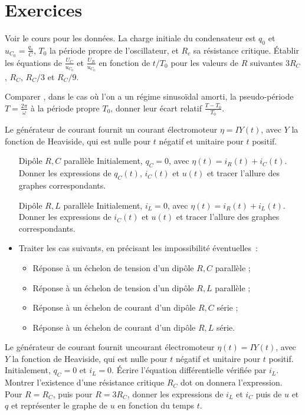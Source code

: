 \section{Exercices}
	\begin{exercice}
		Voir le cours pour les données. La charge initiale du condensateur est $q_0$ et $u_{C_0} = \frac{q_0}{C}$, $T_0$ la période propre de l'oscillateur, et $R_c$ sa résistance critique. Établir les équations de $\frac{U_C}{u_{C_0}}$ et $\frac{U_R}{u_{C_0}}$ en fonction de $t/T_0$ pour les valeurs de $R$ suivantes $3R_C$, $R_C$, $R_C/3$ et $R_C/9$.

		Comparer , dans le cas où l'on a un régime sinusoïdal amorti, la pseudo-période $T=\frac{2\pi}{\omega}$ à la période propre $T_0$, donner leur écart relatif $\frac{T-T_0}{T_0}$.
	\end{exercice}
	\begin{exercice}
		Le générateur de courant fournit un courant électromoteur $\eta = I Y(t)$, avec $Y$ la fonction de Heaviside, qui est nulle pour $t$ négatif et unitaire pour $t$ positif.
		\begin{itemize}
			\item[Dipôle $R, C$ parallèle] Initialement, $q_C=0$, avec $\eta(t) = i_R(t)+i_C(t)$. Donner les expressions de $q_C(t)$, $i_C(t)$ et $u(t)$ et tracer l'allure des graphes correspondants.
			\item[Dipôle $R, L$ parallèle] Initialement, $i_L=0$, avec $\eta(t) = i_R(t)+i_L(t)$. Donner les expressions de $i_C(t)$ et $u(t)$ et tracer l'allure des graphes correspondants.
			\item Traiter les cas suivants, en précisant les impossibilité éventuelles~:
			\begin{itemize}
				\item Réponse à un échelon de tension d'un dipôle $R, C$ parallèle ;
				\item Réponse à un échelon de tension d'un dipôle $R, L$ parallèle ;
				\item Réponse à un échelon de courant d'un dipôle $R, C$ série ;
				\item Réponse à un échelon de courant d'un dipôle $R, L$ série.
			\end{itemize}
		\end{itemize}
	\end{exercice}
	\begin{exercice}
		\label{exo:RLCparallelle}
		Le générateur de courant fournit uncourant électromoteur $\eta(t) = I Y(t)$, avec $Y$ la fonction de Heaviside, qui est nulle pour $t$ négatif et unitaire pour $t$ positif. Initialement, $q_C=0$ et $i_L=0$. Écrire l'équation différentielle vérifiée par $i_L$. Montrer l'existence d'une résistance critique $R_C$ dot on donnera l'expression. Pour $R=R_C$, puis pour $R=3R_C$, donner les expressions de $i_L$ et $i_C$ puis de $u$ et $q$ et représenter le graphe de $u$ en fonction du temps $t$.
	\end{exercice}
